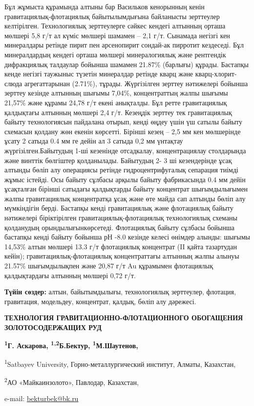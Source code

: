 Бұл жұмыста құрамында алтыны бар Васильков кенорынның кенін
гравитациялық-флотациялық байытылымдығына байланысты зерттеулер
келтірілген. Технологиялық зерттеулерге сәйкес кендегі алтынның орташа
мөлшері 5,8 г/т ал күміс мөлшері шамамен -- 2,1 г/т. Сынамада негізгі
кен минералдары ретінде пирит пен арсенопирит сондай-ак пирротит
кездеседі. Бұл минералдардың кендегі орташа мөлшері минералогиялық және
рентгендік дифракциялық талдаулар бойынша шамамен 21.87\% (барлығы)
құрады. Бастапқы кенде негізгі таужыныс түзетін минералдар ретінде кварц
және кварц-хлорит-слюда агрегаттарынан (2.71\%), тұрады. Жүргізілген
зерттеу нәтижелері бойынша зерттеу кезінде алтынның шығымы 7,04\%,
концентраттың жалпы шығымы 21,57\% және құрамы 24,78 г/т екені
анықталды. Бұл ретте гравитациялық қалдықтағы алтынның мөлшері 2,4 г/т.
Кезеңдік зерттеу тек гравитациялық байыту технологиясын пайдалана
отырып, кенді өңдеу үшін үш сатылы байыту схемасын қолдану жөн екенін
көрсетті. Бірінші кезең -- 2,5 мм кен мөлшерінде ұсату 2 сатыда 0.4 мм
ге дейін ал 3 сатыда 0,2 мм үнтақтау жүргізілген.Байытудың 1-ші
кезенінде отсадкалау, концентрациялау столдарында және винттік бөлгіштер
қолданылады. Байытудың 2- 3 ші кезендерінде ұсақ алтынды бөліп алу
операциясы ретінде гидроцентрифугалық сепарация тиімді жұмыс істейді.
Осы байыту сұлбасы арқылы байыту фабрикасында 0.4 мм дейін ұсақталған
бірінші сатыдағы қалдықтарды байыту концентрат шығымдылығымен жалпы
гравитациялық концентратқа ұсақ және өте майда сап алтынды бөліп алу
мүмкіндігін берді. Бастапқы кенді гравитациялық және флотациялық байыту
нәтижелері біріктірілген гравитациялық-флотациялық технологиялық схеманы
қолданудың орындылығынкөрсетеді. Флотациялық байыту сұлбасы бойынша
бастапқы кенді байыту бойынша рН -8.0 кезінде келесі өнімдер алынды:
шығымы 14,53\% алтын мөлшері 13.3 г/т флотациялық концентрат (II қайта тазартудан кейін);
гравитациялық-флотациялық концентраттағы алтынның жалпы алынуы 21.57\%
шығымдылықпен және 20,87 г/т Au құрамымен флотациялық қалдықтардағы
алтынның мөлшері 0,72 г/т.

{\bfseries Түйін сөздер:} алтын, байытымдылығы, технологиялық зерттеулер,
флотация, гравитация, модельдеу, концентрат, қалдық, бөліп алу дәрежесі.
\begin{articleheader}

{\bfseries ТЕХНОЛОГИЯ ГРАВИТАЦИОННО-ФЛОТАЦИОННОГО ОБОГАЩЕНИЯ
ЗОЛОТОСОДЕРЖАЩИХ РУД}

{\bfseries \textsuperscript{1}Г. Аскарова,
\textsuperscript{1,2}Б.Бектур\textsuperscript{\envelope },
  \textsuperscript{1}М.Шаутенов, }
\end{articleheader}
\begin{affiliation}
\textsuperscript{1}Satbayev University, Горно-металлургический институт,
Алматы, Казахстан,

\textsuperscript{2}АО «Майкаинзолото», Павлодар, Казахстан,

e-mail: \href{mailto:bekturbek@bk.run}{bekturbek@bk.ru}
\end{affiliation}

